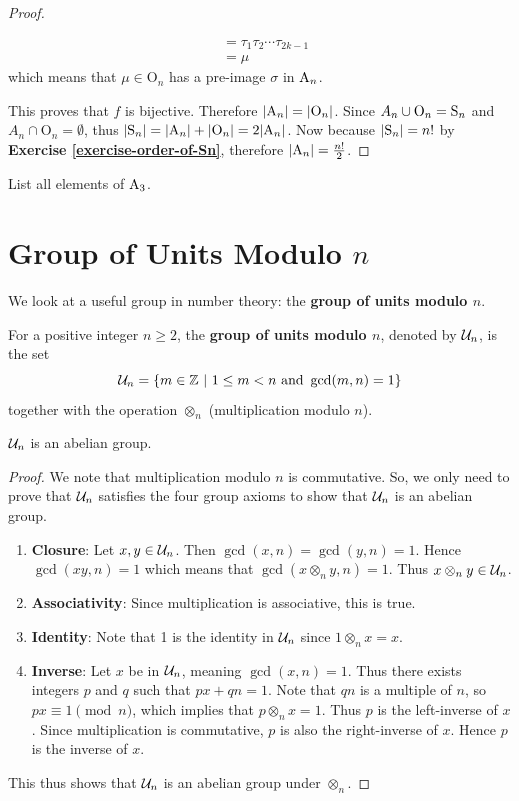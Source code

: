 \begin{proof}
\begin{itemize}
\begin{align*}
            &= \tau_1\tau_2\cdots\tau_{2k-1}\\
            &= \mu
        \end{align*}
        which means that $\mu \in \mathrm{O}_n$ has a pre-image $\sigma$ in $\mathrm{A}_{n}$.
    \end{itemize}
    This proves that $f$ is bijective. Therefore $|\mathrm{A}_{n}| = |\mathrm{O}_n|$. Since $A_n \cup \mathrm{O}_n = \mathrm{S}_{n}$ and $A_n \cap \mathrm{O}_n = \emptyset$, thus $|\mathrm{S}_{n}| = |\mathrm{A}_{n}| + |\mathrm{O}_n| = 2|\mathrm{A}_{n}|$. Now because $|\mathrm{S}_{n}| = n!$ by \textbf{Exercise \ref{exercise-order-of-Sn}}, therefore $|\mathrm{A}_{n}| = \frac{n!}2$.
\end{proof}

\begin{exercise}
    List all elements of $\mathrm{A}_{3}$.
\end{exercise}

\newpage

\section{Group of Units Modulo $n$}
We look at a useful group in number theory: the \textbf{group of units modulo $n$}.

\begin{definition}
    For a positive integer $n \geq 2$, the \textbf{group of units modulo $n$}, denoted by $\mathcal{U}_{n}$, is the set
    \[
        \mathcal{U}_{n} = \{m \in \mathbb{Z} \ | \ 1 \leq m < n \text{ and } \gcd(m, n) = 1\}
    \]
    together with the operation $\otimes_n$ (multiplication modulo $n$).
\end{definition}
\begin{proposition}
    $\mathcal{U}_{n}$ is an abelian group.
\end{proposition}
\begin{proof}
    We note that multiplication modulo $n$ is commutative. So, we only need to prove that $\mathcal{U}_{n}$ satisfies the four group axioms to show that $\mathcal{U}_{n}$ is an abelian group.
    \begin{enumerate}
        \item \textbf{Closure}: Let $x, y \in \mathcal{U}_{n}$. Then $\gcd(x, n) = \gcd(y, n) = 1$. Hence $\gcd(xy, n) = 1$ which means that $\gcd(x\otimes_ny,n)=1$. Thus $x\otimes_ny \in \mathcal{U}_{n}$.
        \item \textbf{Associativity}: Since multiplication is associative, this is true.
        \item \textbf{Identity}: Note that 1 is the identity in $\mathcal{U}_{n}$ since $1 \otimes_n x = x$.
        \item \textbf{Inverse}: Let $x$ be in $\mathcal{U}_{n}$, meaning $\gcd(x, n) = 1$. Thus there exists integers $p$ and $q$ such that $px + qn = 1$. Note that $qn$ is a multiple of $n$, so $px \equiv 1 \pmod{n}$, which implies that $p \otimes_n x = 1$. Thus $p$ is the left-inverse of $x$. Since multiplication is commutative, $p$ is also the right-inverse of $x$. Hence $p$ is the inverse of $x$.
    \end{enumerate}
    This thus shows that $\mathcal{U}_{n}$ is an abelian group under $\otimes_n$.
\end{proof}

